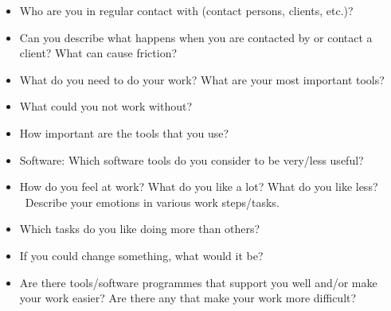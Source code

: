 \documentclass[output=paper]{langscibook}
\begin{document}
\begin{itemize}
\itemsep0em
    \item Who are you in regular contact with (contact persons, clients, etc.)?
    \item Can you describe what happens when you are contacted by or contact a client? What can cause friction?
\end{itemize}


\begin{itemize}
\itemsep0em
    \item What do you need to do your work? What are your most important tools?
    \item What could you not work without?
    \item How important are the tools that you use?
    \item Software: Which software tools do you consider to be very/less useful?
\end{itemize}


\begin{itemize}
\itemsep0em
    \item How do you feel at work? What do you like a lot? What do you like less? \rightarrow ~Describe your emotions in various work steps/tasks.
    \item Which tasks do you like doing more than others?
    \item If you could change something, what would it be?
    \item Are there tools/software programmes that support you well and/or make your work easier? Are there any that make your work more difficult?
\end{itemize}


{\sloppy\printbibliography[heading=subbibliography,notkeyword=this]}
\end{document}
